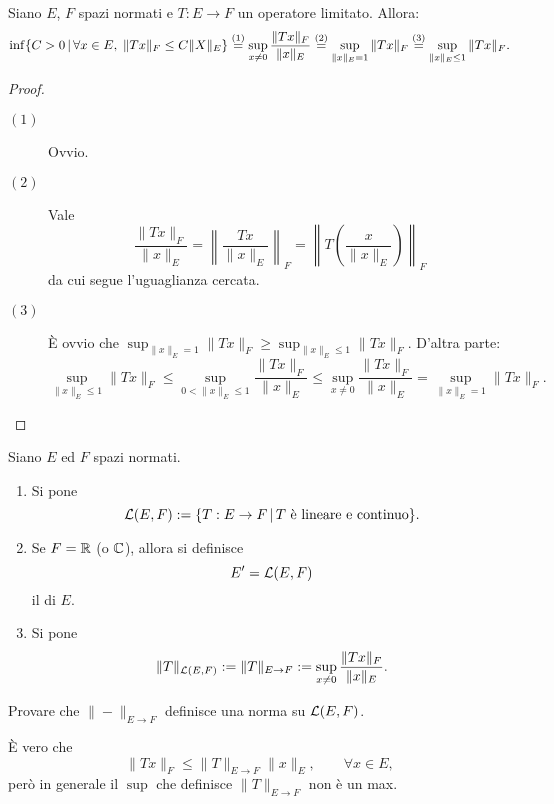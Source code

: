 \begin{lemma}
	Siano $E$, $F$ spazi normati e $T:E \to F$ un operatore limitato. Allora:
	$$
		\inf\{C > 0 \,|\, \forall x \in E,\; \|Tx\|_F \leq C\|X\|_E \} \overset{(1)}= \sup_{x \neq 0} \frac{\|Tx\|_F}{\|x\|_E} \overset{(2)}= \sup_{\|x\|_E=1} \|Tx\|_F \overset{(3)}= \sup_{\|x\|_E \leq 1} \|Tx\|_F.
	$$
\end{lemma}
\begin{proof}
	\leavevmode
	\begin{description}
		\item[$(1)$] Ovvio.
		\item[$(2)$] Vale
		$$
			\frac{\|Tx\|_F}{\|x\|_E} = \left\| \frac{Tx}{\|x\|_E} \right\|_F = \left\|T\left(\frac{x}{\|x\|_E}\right)\right\|_F
		$$
		da cui segue l'uguaglianza cercata.
		\item[$(3)$] È ovvio che $\sup_{\|x\|_E=1} \|Tx\|_F \geq \sup_{\|x\|_E \leq 1} \|Tx\|_F$. D'altra parte:
		$$
			\sup_{\|x\|_E \leq 1} \|Tx\|_F \leq \sup_{0 < \|x\|_E \leq 1} \frac{\|Tx\|_F}{\|x\|_E} \leq  \sup_{x \neq 0} \frac{\|Tx\|_F}{\|x\|_E} = \sup_{\|x\|_E = 1} \|Tx\|_F.
		$$
	\end{description}
\end{proof}

\begin{definition}
	Siano $E$ ed $F$ spazi normati.
	\begin{enumerate}
		\item Si pone
		$$
			\mathcal{L}(E, F) := \{ T:E \to F \,|\, \text{$T$ è lineare e continuo}\}.
		$$
		\item Se $F=\mathbb{R}$ (o $\mathbb{C}$), allora si definisce
		$$
			E' = \mathcal{L}(E, F)
		$$
		il  di $E$.
		\item Si pone
		$$
			\|T\|_{\mathcal{L}(E,F)} := \|T\|_{E \to F} := \sup_{x \neq 0} \frac{\|Tx\|_F}{\|x\|_E}.
		$$
	\end{enumerate}
\end{definition}

\begin{exercise}
	Provare che $\|-\|_{E \to F}$ definisce una norma su $\mathcal{L}(E,F)$.
\end{exercise}

\begin{remark}
	È vero che
	$$
		\|Tx\|_F \leq \|T\|_{E \to F} \|x\|_E, \qquad \forall x \in E,
	$$
	però in generale il $\sup$ che definisce $\|T\|_{E \to F}$ non è un max.
\end{remark}

